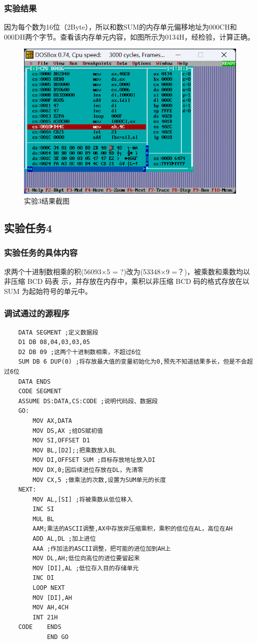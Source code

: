 \documentclass[12pt, a4paper, oneside]{ctexart}
\begin{document}
\subsubsection{实验结果}
因为每个数为16位（2Byte），所以和数SUM的内存单元偏移地址为000CH和000DH两个字节。查看该内存单元内容，如图所示为0134H，经检验，计算正确。
\begin{figure}[H]
    \centering
    \includegraphics[scale=0.6]{pic/exp1_3.png}
    \caption{实验3结果截图}
\end{figure}
\subsection{实验任务4}
\subsubsection{实验任务的具体内容}
求两个十进制数相乘的积(56093×5 = ?)改为(53348×9 =？)，被乘数和乘数均以非压缩 BCD 码表
示，并存放在内存中，乘积以非压缩 BCD 码的格式存放在以 SUM 为起始符号的单元中。
\subsubsection{调试通过的源程序}
\begin{lstlisting}
    DATA SEGMENT ;定义数据段
    D1 DB 08,04,03,03,05
    D2 DB 09 ;这两个十进制数相乘，不超过6位
    SUM DB 6 DUP(0) ;将存放最大值的变量初始化为0,预先不知道结果多长，但是不会超过6位
    DATA ENDS
    CODE SEGMENT 
    ASSUME DS:DATA,CS:CODE ;说明代码段、数据段
    GO: 
        MOV AX,DATA 
        MOV DS,AX ;给DS赋初值
        MOV SI,OFFSET D1 
        MOV BL,[D2];;把乘数放入BL
        MOV DI,OFFSET SUM ;目标存放地址放入DI
        MOV DX,0;因后续进位存放在DL，先清零
        MOV CX,5 ;做乘法的次数,设置为SUM单元的长度
    NEXT:
        MOV AL,[SI] ;将被乘数从低位移入
        INC SI
        MUL BL
        AAM;乘法的ASCII调整,AX中存放非压缩乘积，乘积的低位在AL，高位在AH
        ADD AL,DL ;加上进位
        AAA ;作加法的ASCII调整，把可能的进位加到AH上
        MOV DL,AH;低位向高位的进位要留起来
        MOV [DI],AL ;低位存入目的存储单元
        INC DI
        LOOP NEXT
        MOV [DI],AH
        MOV AH,4CH
        INT 21H
    CODE 	ENDS
            END GO
\end{lstlisting}
\end{document}
